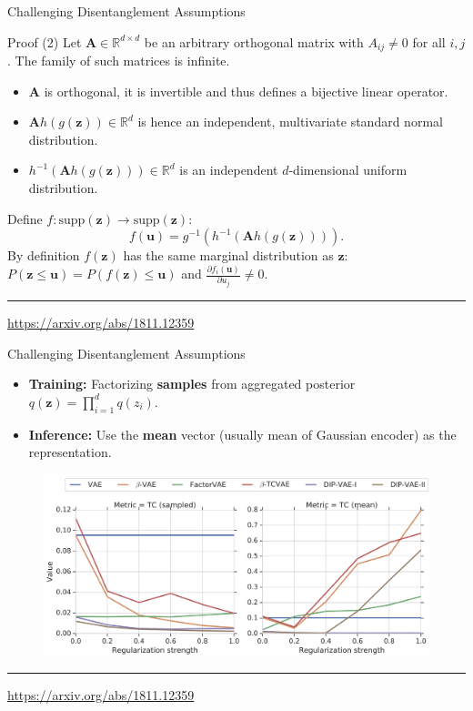 \documentclass{beamer}
\newcommand{\bu}{\mathbf{u}}
\newcommand{\bz}{\mathbf{z}}
\newcommand{\bA}{\mathbf{A}}
\newcommand{\bbR}{\mathbb{R}}
\begin{document}
\begin{frame}{Challenging Disentanglement Assumptions}
	\begin{block}{Proof (2)}
		Let $\bA \in \bbR^{d \times d}$ be an arbitrary orthogonal matrix with $A_{ij} \neq 0$ for all $i, j$.
		The family of such matrices is infinite.
		\begin{itemize}
			\item $\bA$ is orthogonal, it is invertible and thus defines a bijective linear operator. 
			\item $\bA h(g(\bz)) \in \bbR^d$ is hence an independent, multivariate standard normal distribution.
			\item $h^{-1}( \bA h(g(\bz))) \in \bbR^d$ is an independent $d$-dimensional uniform distribution.
		\end{itemize}
		Define $f: \text{supp}(\bz) \rightarrow \text{supp}(\bz)$:
		\[
			f(\bu) = g^{-1} (h^{-1}( \bA h(g(\bz)))).
		\]
		By definition $f(\bz)$ has the same marginal distribution as $\bz$: $P(\bz \leq \bu) = P(f(\bz) \leq \bu)$ and $\frac{\partial f_i(\bu)}{\partial u_j} \neq 0$.
		\end{block}
	
	\vfill
	\hrule\medskip
	{\scriptsize \href{https://arxiv.org/abs/1811.12359}{https://arxiv.org/abs/1811.12359}}
\end{frame}
\begin{frame}{Challenging Disentanglement Assumptions}
	\begin{itemize}
		\item \textbf{Training:} Factorizing \textbf{samples} from aggregated posterior $q(\bz) = \prod_{i=1}^d q(z_i)$.
		\item \textbf{Inference:} Use the \textbf{mean} vector (usually mean of Gaussian encoder) as the representation.
	\end{itemize}
	\begin{figure}
		\centering
		\includegraphics[width=0.95\linewidth]{figs/challenge_dis_1}
	\end{figure}
	\vfill
	\hrule\medskip
	{\scriptsize \href{https://arxiv.org/abs/1811.12359}{https://arxiv.org/abs/1811.12359}}
\end{frame}
\end{document}
